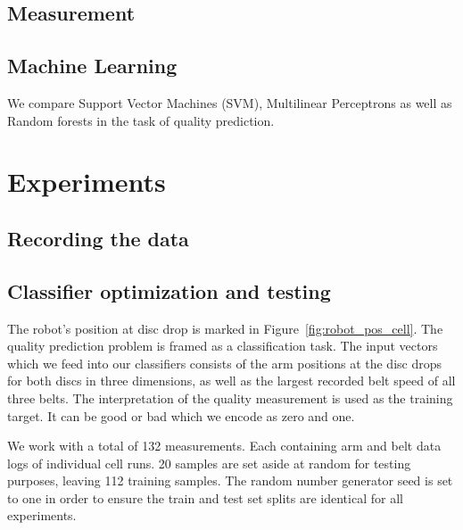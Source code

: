 \documentclass[5p,times,procedia]{elsarticle}
\begin{document}
\subsection{Measurement}


\subsection{Machine Learning}
We compare Support Vector Machines (SVM), Multilinear Perceptrons
\cite{bishop2006pattern} as well as Random forests in the task of
quality prediction. 


\section{Experiments}

\subsection{Recording the data}


\subsection{Classifier optimization and testing}\label{sec:ml_exp}
The robot's position at disc drop is marked in 
Figure~\ref{fig:robot_pos_cell}. The quality prediction problem is 
framed as a classification task. The input vectors which we feed into our
classifiers consists of the arm positions at the disc drops for both
discs in three dimensions, as well as the largest recorded belt speed
of all three belts. The interpretation of the quality measurement is 
used as the training target. It can be good or bad which we encode as 
zero and one.

We work with a total of 132 measurements. Each containing arm and belt data
logs of individual cell runs. 20 samples are set aside at random for testing 
purposes, leaving 112 training samples. The random number generator seed is
set to one in order to ensure the train and test set splits are identical 
for all experiments.
\end{document}
